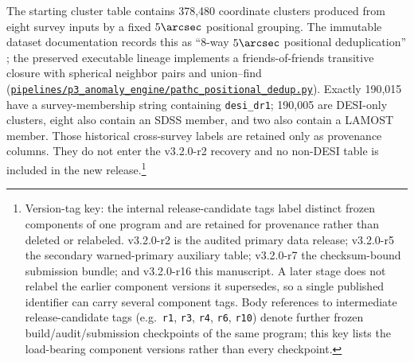 \documentclass[twocolumn,linenumbers]{aastex702}
\newcommand{\repoBase}{https://github.com/Hubify-Projects/bigbounce/blob/main}
\newcommand{\artifact}[1]{\href{\repoBase/#1}{\nolinkurl{#1}}}
\newcommand{\paperVersion}{v3.2.0-r16}
\newcommand{\releaseVersion}{v3.2.0-r2}
\newcommand{\warnedAuxVersion}{v3.2.0-r5}
\newcommand{\bundleVersion}{v3.2.0-r7}
\begin{document}
The starting cluster table contains 378,480 coordinate clusters produced from eight survey
inputs by a fixed $5\arcsec$ positional grouping.  The immutable dataset documentation records
this as ``8-way $5\arcsec$ positional deduplication'' \citep{Golden2026Data}; the preserved
executable lineage implements a friends-of-friends transitive closure with spherical neighbor
pairs and union--find
(\artifact{pipelines/p3\_anomaly\_engine/pathc\_positional\_dedup.py}).  Exactly 190,015 have a
survey-membership string containing \texttt{desi\_dr1};
190,005 are DESI-only clusters, eight also contain an SDSS member, and two also contain a LAMOST
member.  Those historical cross-survey labels are retained only as provenance columns.  They do
not enter the \releaseVersion{} recovery and no non-DESI table is included in the new
release.\footnote{Version-tag key: the internal release-candidate tags label distinct frozen
components of one program and are retained for provenance rather than deleted or relabeled.
\releaseVersion{} is the audited primary data release; \warnedAuxVersion{} the secondary
warned-primary auxiliary table; \bundleVersion{} the checksum-bound submission bundle; and
\paperVersion{} this manuscript.  A later stage does not relabel the earlier component versions it
supersedes, so a single published identifier can carry several component tags.  Body references to
intermediate release-candidate tags (e.g.\ \texttt{r1}, \texttt{r3}, \texttt{r4}, \texttt{r6},
\texttt{r10}) denote further frozen build/audit/submission checkpoints of the same program; this
key lists the load-bearing component versions rather than every checkpoint.}
\end{document}
